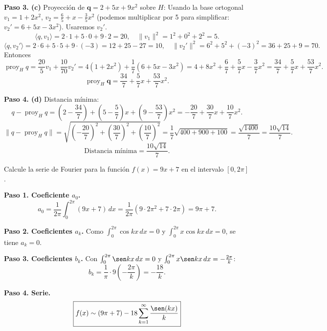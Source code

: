 \begin{prob}
\begin{myproof}
\textbf{Paso 3. (c)} Proyección de \( \mathbf{q} = 2+5x+9x^2 \) sobre \( H \):
Usando la base ortogonal \( v_1 = 1+2x^2 \), \( v_2 = \frac{6}{5} + x - \frac{3}{5}x^2 \) (podemos multiplicar por 5 para simplificar: \( v_2' = 6+5x-3x^2 \)). Usaremos \( v_2' \).
\[
\langle q, v_1 \rangle = 2\cdot 1 + 5\cdot 0 + 9\cdot 2 = 20,\quad \|v_1\|^2 = 1^2+0^2+2^2=5.
\]
\[
\langle q, v_2' \rangle = 2\cdot 6 + 5\cdot 5 + 9\cdot (-3) = 12+25-27=10,\quad \|v_2'\|^2 = 6^2+5^2+(-3)^2 = 36+25+9=70.
\]
Entonces
\[
\operatorname{proy}_H q = \frac{20}{5}v_1 + \frac{10}{70}v_2' = 4(1+2x^2) + \frac{1}{7}(6+5x-3x^2)
= 4+8x^2 + \frac{6}{7} + \frac{5}{7}x - \frac{3}{7}x^2
= \frac{34}{7} + \frac{5}{7}x + \frac{53}{7}x^2.
\]
\[
\boxed{\operatorname{proy}_H \mathbf{q} = \frac{34}{7} + \frac{5}{7}x + \frac{53}{7}x^2}.
\]

\textbf{Paso 4. (d)} Distancia mínima:
\[
q - \operatorname{proy}_H q = \left(2 - \frac{34}{7}\right) + \left(5 - \frac{5}{7}\right)x + \left(9 - \frac{53}{7}\right)x^2
= -\frac{20}{7} + \frac{30}{7}x + \frac{10}{7}x^2.
\]
\[
\|q - \operatorname{proy}_H q\| = \sqrt{ \left(-\frac{20}{7}\right)^2 + \left(\frac{30}{7}\right)^2 + \left(\frac{10}{7}\right)^2 }
= \frac{1}{7}\sqrt{400+900+100} = \frac{\sqrt{1400}}{7} = \frac{10\sqrt{14}}{7}.
\]
\[
\boxed{\text{Distancia mínima} = \frac{10\sqrt{14}}{7}}.
\]
\end{myproof}
\end{prob}

\begin{prob}
Calcule la serie de Fourier para la función $f(x)=9x+7$ en el intervalo $[0,2\pi]$.
\begin{myproof}
\textbf{Paso 1. Coeficiente $a_0$.}
\[
a_0 = \frac{1}{2\pi}\int_0^{2\pi} (9x+7)\,dx = \frac{1}{2\pi}\left(9\cdot 2\pi^2 + 7\cdot 2\pi\right) = 9\pi + 7.
\]

\textbf{Paso 2. Coeficientes $a_k$.} Como $\int_0^{2\pi} \cos kx\,dx = 0$ y $\int_0^{2\pi} x\cos kx\,dx = 0$, se tiene $a_k = 0$.

\textbf{Paso 3. Coeficientes $b_k$.} Con $\int_0^{2\pi} \sen kx\,dx = 0$ y $\int_0^{2\pi} x\sen kx\,dx = -\frac{2\pi}{k}$:
\[
b_k = \frac{1}{\pi}\cdot 9\left(-\frac{2\pi}{k}\right) = -\frac{18}{k}.
\]

\textbf{Paso 4. Serie.}
\[
\boxed{f(x) \sim (9\pi + 7) - 18 \sum_{k=1}^{\infty} \frac{\sen(kx)}{k}}
\]
\end{myproof}
\end{prob}


